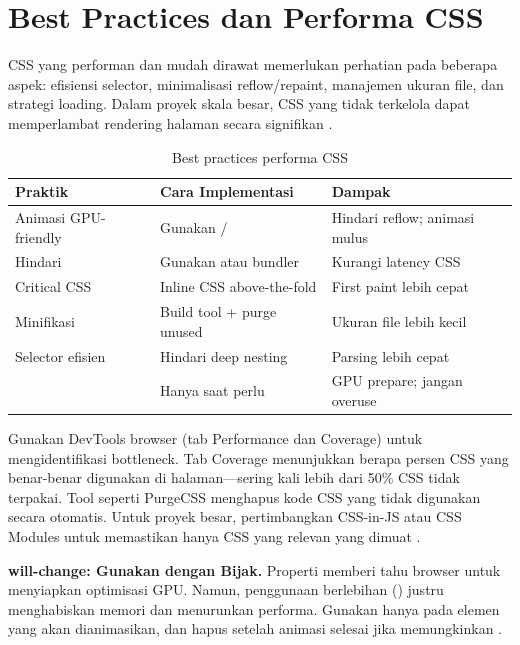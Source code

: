 \section{Best Practices dan Performa CSS}

CSS yang performan dan mudah dirawat memerlukan perhatian pada beberapa aspek: efisiensi selector, minimalisasi reflow/repaint, manajemen ukuran file, dan strategi loading. Dalam proyek skala besar, CSS yang tidak terkelola dapat memperlambat rendering halaman secara signifikan \cite{webdevCss}.

\begin{table}[htbp]
\centering
\begin{tabular}{|P{3.5cm}|P{4cm}|P{4.5cm}|}
\hline
\textbf{Praktik} & \textbf{Cara Implementasi} & \textbf{Dampak} \\
\hline
Animasi GPU-friendly & Gunakan / & Hindari reflow; animasi mulus \\
\hline
Hindari  & Gunakan  atau bundler & Kurangi latency CSS \\
\hline
Critical CSS & Inline CSS above-the-fold & First paint lebih cepat \\
\hline
Minifikasi & Build tool + purge unused & Ukuran file lebih kecil \\
\hline
Selector efisien & Hindari deep nesting & Parsing lebih cepat \\
\hline
{} & Hanya saat perlu & GPU prepare; jangan overuse \\
\hline
\end{tabular}
\caption{Best practices performa CSS}
\end{table}

Gunakan DevTools browser (tab Performance dan Coverage) untuk mengidentifikasi bottleneck. Tab Coverage menunjukkan berapa persen CSS yang benar-benar digunakan di halaman---sering kali lebih dari 50\% CSS tidak terpakai. Tool seperti PurgeCSS menghapus kode CSS yang tidak digunakan secara otomatis. Untuk proyek besar, pertimbangkan CSS-in-JS atau CSS Modules untuk memastikan hanya CSS yang relevan yang dimuat \cite{mdnCss}.

\begin{konsep}
\textbf{will-change: Gunakan dengan Bijak.} Properti  memberi tahu browser untuk menyiapkan optimisasi GPU. Namun, penggunaan berlebihan () justru menghabiskan memori dan menurunkan performa. Gunakan hanya pada elemen yang akan dianimasikan, dan hapus setelah animasi selesai jika memungkinkan \cite{webdevCss}.
\end{konsep}

